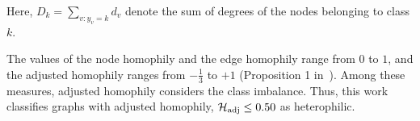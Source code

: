 Here, $D_k = \sum_{v:y_v=k}d_v$ denote the sum of degrees of the nodes belonging to class $k$. 

The values of the node homophily and the edge homophily range from $0$ to $1$, and the adjusted homophily ranges from $-\frac{1}{3}$ to $+1$ (Proposition 1 in~\cite{platonov2022characterizing}). 
Among these measures, adjusted homophily considers the class imbalance. Thus, this work classifies graphs with adjusted homophily, ${\mathcal{H}}_\mathrm {adj} \le 0.50$ as heterophilic.


\clearpage